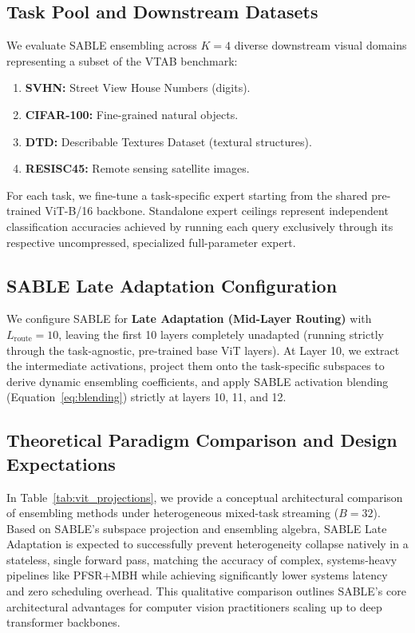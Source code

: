 \documentclass{article}
\theoremstyle{plain}
\theoremstyle{definition}
\theoremstyle{remark}
\begin{document}
\subsection{Task Pool and Downstream Datasets}
We evaluate SABLE ensembling across $K=4$ diverse downstream visual domains representing a subset of the VTAB benchmark:
\begin{enumerate}
    \item \textbf{SVHN:} Street View House Numbers (digits).
    \item \textbf{CIFAR-100:} Fine-grained natural objects.
    \item \textbf{DTD:} Describable Textures Dataset (textural structures).
    \item \textbf{RESISC45:} Remote sensing satellite images.
\end{enumerate}
For each task, we fine-tune a task-specific expert starting from the shared pre-trained ViT-B/16 backbone. Standalone expert ceilings represent independent classification accuracies achieved by running each query exclusively through its respective uncompressed, specialized full-parameter expert.

\subsection{SABLE Late Adaptation Configuration}
We configure SABLE for \textbf{Late Adaptation (Mid-Layer Routing)} with $L_{\text{route}} = 10$, leaving the first 10 layers completely unadapted (running strictly through the task-agnostic, pre-trained base ViT layers). At Layer 10, we extract the intermediate activations, project them onto the task-specific subspaces to derive dynamic ensembling coefficients, and apply SABLE activation blending (Equation~\ref{eq:blending}) strictly at layers 10, 11, and 12.

\subsection{Theoretical Paradigm Comparison and Design Expectations}
In Table~\ref{tab:vit_projections}, we provide a conceptual architectural comparison of ensembling methods under heterogeneous mixed-task streaming ($B=32$). Based on SABLE's subspace projection and ensembling algebra, SABLE Late Adaptation is expected to successfully prevent heterogeneity collapse natively in a stateless, single forward pass, matching the accuracy of complex, systems-heavy pipelines like PFSR+MBH while achieving significantly lower systems latency and zero scheduling overhead. This qualitative comparison outlines SABLE's core architectural advantages for computer vision practitioners scaling up to deep transformer backbones.
\end{document}
